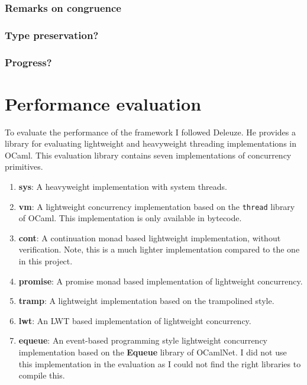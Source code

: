 \documentclass[12pt,twoside,notitlepage]{report}
\begin{document}
\subsubsection{Remarks on congruence}
\subsubsection{Type preservation?}
\subsubsection{Progress?} 

\section{Performance evaluation}
To evaluate the performance of the framework I followed Deleuze\cite{deleuzelight}. He provides a library for evaluating lightweight and heavyweight threading implementations in OCaml. This evaluation library contains seven implementations of concurrency primitives.
\begin{enumerate}
\item{\textbf{sys}: A heavyweight implementation with system threads.}
\item{\textbf{vm}: A lightweight concurrency implementation based on the \verb|thread| library of OCaml. This implementation is only available in bytecode.}
\item{\textbf{cont}: A continuation monad based lightweight implementation\cite[p.~12-13]{deleuzelight}, without verification. Note, this is a much lighter implementation compared to the one in this project.}
\item{\textbf{promise}: A promise monad based implementation of lightweight concurrency\cite[p.~13-15]{deleuzelight}.}
\item{\textbf{tramp}: A lightweight implementation based on the trampolined style\cite[p.~11-12]{deleuzelight}.}
\item{\textbf{lwt}: An LWT\cite{LWT} based implementation of lightweight concurrency.}
\item{\textbf{equeue}: An event-based programming style lightweight concurrency implementation\cite[p.~15-18]{deleuzelight} based on the \textbf{Equeue} library of OCamlNet. I did not use this implementation in the evaluation as I could not find the right libraries to compile this.}
\end{enumerate}
\end{document}
